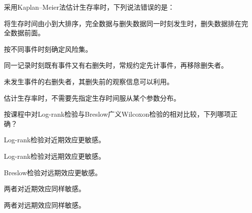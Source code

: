 \par\addvspace{8pt}\noindent\begin{minipage}{\linewidth}


采用Kaplan--Meier法估计生存率时，下列说法错误的是：


\begin{choices}

\item 将生存时间由小到大排序，完全数据与删失数据同一时刻发生时，删失数据排在完全数据前面。

\item 按不同事件时刻确定风险集。

\item 同一记录时刻既有事件又有右删失时，常规约定先计事件，再移除删失者。

\item 未发生事件的右删失者，其删失前的观察信息可以利用。

\item 估计生存率时，不需要先指定生存时间服从某个参数分布。

\end{choices}

\end{minipage}\par\vspace{5pt}

\par\addvspace{8pt}\noindent\begin{minipage}{\linewidth}


按课程中对Log-rank检验与Breslow广义Wilcoxon检验的相对比较，下列哪项正确？


\begin{choices}

\item Log-rank检验对近期效应更敏感。

\item Log-rank检验对远期效应更敏感。

\item Breslow检验对远期效应更敏感。

\item 两者对近期效应同样敏感。

\item 两者对远期效应同样敏感。

\end{choices}

\end{minipage}\par\vspace{5pt}

